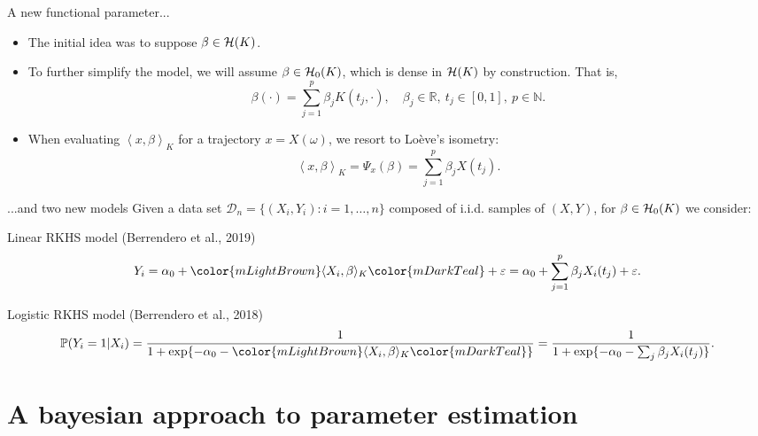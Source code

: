 \documentclass[10pt, english, professionalfonts]{beamer}
\newcommand\maroon[1]{\color{mLightBrown}#1\color{mDarkTeal}}
\newcommand{\N}{\mathbb{N}}
\newcommand{\R}{\mathbb{R}}
\newcommand{\Hcal}{\ensuremath\mathcal{H}}
\newcommand\dotprod[2]{\left\langle #1, #2 \right\rangle}
\begin{document}
\begin{frame}{A new functional parameter...}
  \begin{itemize}
    \item The initial idea was to suppose \(\beta \in \Hcal(K)\).
    \item To further simplify the model, we will assume \(\beta \in \Hcal_0(K)\), which is dense in \(\Hcal(K)\) by construction. That is,
    \[
      \beta(\cdot) = \sum_{j=1}^p \beta_j K(t_j, \cdot), \quad \beta_j \in \R, \ t_j \in [0, 1], \ p \in \N.
    \]
    \item When evaluating \(\dotprod{x}{\beta}_K\) for a trajectory \(x=X(\omega)\), we resort to Loève's isometry:
    \[
      \dotprod{x}{\beta}_K = \Psi_x(\beta) = \sum_{j=1}^p \beta_j X(t_j).
    \]
  \end{itemize}

\end{frame}


\begin{frame}{...and two new models}
  Given a data set \(\mathcal D_n = \{(X_i, Y_i): i=1,\dots, n\}\) composed of i.i.d. samples of \((X, Y)\), for \(\beta \in \Hcal_0(K)\) we consider:

  \vspace{1em}

  \begin{block}{Linear RKHS model (Berrendero et al., 2019)}
  \[
    Y_i = \alpha_0 + \maroon{\langle X_i, \beta \rangle_K} + \varepsilon = \alpha_0 + \sum_{j=1}^p \beta_j X_i(t_j) + \varepsilon.
  \]
\end{block}
\vspace{1em}
\begin{block}{Logistic RKHS model (Berrendero et al., 2018)}
    \[
    \mathbb P (Y_i=1| X_i) = \frac{1}{1 + \exp\{-\alpha_0 - \maroon{\langle X_i, \beta\rangle_K}\}} = \frac{1}{1 + \exp\{-\alpha_0 - \sum_j \beta_j X_i(t_j)\}}.
  \]
\end{block}

\end{frame}

\section{A bayesian approach to parameter estimation}
\end{document}
